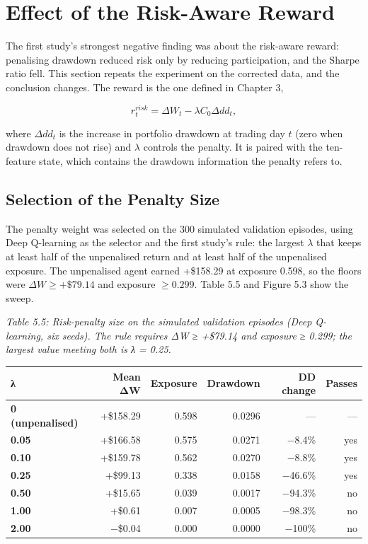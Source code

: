 \section{Effect of the Risk-Aware Reward}

The first study's strongest negative finding was about the risk-aware reward:
penalising drawdown reduced risk only by reducing participation, and the
Sharpe ratio fell. This section repeats the experiment on the corrected
data, and the conclusion changes. The reward is the one defined in
Chapter 3,

\[r_{t}^{risk} = \Delta W_{t} - \lambda C_{0}\Delta dd_{t},\]

where \(\Delta dd_{t}\) is the increase in portfolio drawdown at trading
day \(t\) (zero when drawdown does not rise) and \(\lambda\) controls
the penalty. It is paired with the ten-feature state, which contains the
drawdown information the penalty refers to.

\subsection{Selection of the Penalty Size}

The penalty weight was selected on the 300 simulated validation
episodes, using Deep Q-learning as the selector and the first study's rule:
the largest \(\lambda\) that keeps at least half of the unpenalised
return and at least half of the unpenalised exposure. The unpenalised
agent earned +\$158.29 at exposure 0.598, so the floors were
\(\Delta W \geq +\$79.14\) and exposure \(\geq 0.299\). Table 5.5 and
Figure 5.3 show the sweep.

\emph{Table 5.5: Risk-penalty size on the simulated validation episodes
(Deep Q-learning, six seeds). The rule requires ΔW ≥ +\$79.14 and
exposure ≥ 0.299; the largest value meeting both is λ = 0.25.}

{\def\LTcaptype{none}
\begin{longtable}[]{@{}lrrrrr@{}}
\toprule\noalign{}
\textbf{λ} & \textbf{Mean ΔW} & \textbf{Exposure} & \textbf{Drawdown} &
\textbf{DD change} & \textbf{Passes} \\
\midrule\noalign{}
\endhead
\bottomrule\noalign{}
\endlastfoot
\textbf{0 (unpenalised)} & +\$158.29 & 0.598 & 0.0296 & --- & --- \\
\rowsep
\textbf{0.05} & +\$166.58 & 0.575 & 0.0271 & −8.4\% & yes \\
\rowsep
\textbf{0.10} & +\$159.78 & 0.562 & 0.0270 & −8.8\% & yes \\
\rowsep
\textbf{0.25} & +\$99.13 & 0.338 & 0.0158 & −46.6\% & yes \\
\rowsep
\textbf{0.50} & +\$15.65 & 0.039 & 0.0017 & −94.3\% & no \\
\rowsep
\textbf{1.00} & +\$0.61 & 0.007 & 0.0005 & −98.3\% & no \\
\rowsep
\textbf{2.00} & −\$0.04 & 0.000 & 0.0000 & −100\% & no \\
\end{longtable}
}


